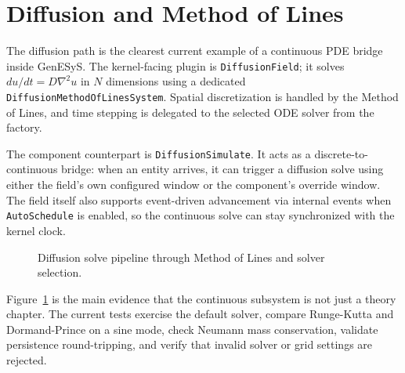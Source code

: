 \section{Diffusion and Method of Lines}
\label{sec:diffusion-and-method-of-lines}

The diffusion path is the clearest current example of a continuous PDE bridge
inside GenESyS. The kernel-facing plugin is \texttt{DiffusionField}; it solves
\(du/dt = D \nabla^2 u\) in \(N\) dimensions using a dedicated
\texttt{DiffusionMethodOfLinesSystem}. Spatial discretization is handled by the
Method of Lines, and time stepping is delegated to the selected ODE solver from
the factory.

The component counterpart is \texttt{DiffusionSimulate}. It acts as a
discrete-to-continuous bridge: when an entity arrives, it can trigger a
diffusion solve using either the field's own configured window or the
component's override window. The field itself also supports event-driven
advancement via internal events when \texttt{AutoSchedule} is enabled, so the
continuous solve can stay synchronized with the kernel clock.

\begin{figure}[htbp]
\centering
\caption{Diffusion solve pipeline through Method of Lines and solver selection.}
\label{fig:diffusion-mol-flow}
\end{figure}

Figure~\ref{fig:diffusion-mol-flow} is the main evidence that the continuous
subsystem is not just a theory chapter. The current tests exercise the default
solver, compare Runge-Kutta and Dormand-Prince on a sine mode, check Neumann
mass conservation, validate persistence round-tripping, and verify that invalid
solver or grid settings are rejected.

